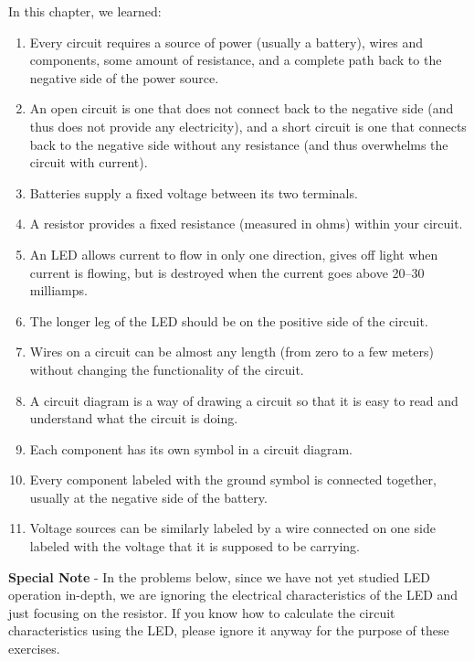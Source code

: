 
\reviewsection

In this chapter, we learned:

\begin{enumerate}
\item Every circuit requires a source of power (usually a battery), wires and components, some amount of resistance, and a complete path back to the negative side of the power source.
\item An open circuit is one that does not connect back to the negative side (and thus does not provide any electricity), and a short circuit is one that connects back to the negative side without any resistance (and thus overwhelms the circuit with current).
\item Batteries supply a fixed voltage between its two terminals.
\item A resistor provides a fixed resistance (measured in ohms) within your circuit.
\item An LED allows current to flow in only one direction, gives off light when current is flowing, but is destroyed when the current goes above 20--30 milliamps.
\item The longer leg of the LED should be on the positive side of the circuit.
\item Wires on a circuit can be almost any length (from zero to a few meters) without changing the functionality of the circuit.
\item A circuit diagram is a way of drawing a circuit so that it is easy to read and understand what the circuit is doing.
\item Each component has its own symbol in a circuit diagram.
\item Every component labeled with the ground symbol is connected together, usually at the negative side of the battery.
\item Voltage sources can be similarly labeled by a wire connected on one side labeled with the voltage that it is supposed to be carrying.
\end{enumerate}

\applysection

\textbf{Special Note} - In the problems below, since we have not yet studied LED operation in-depth, we are ignoring the electrical characteristics of the LED and just focusing on the resistor.  
If you know how to calculate the circuit characteristics using the LED, please ignore it anyway for the purpose of these exercises.

